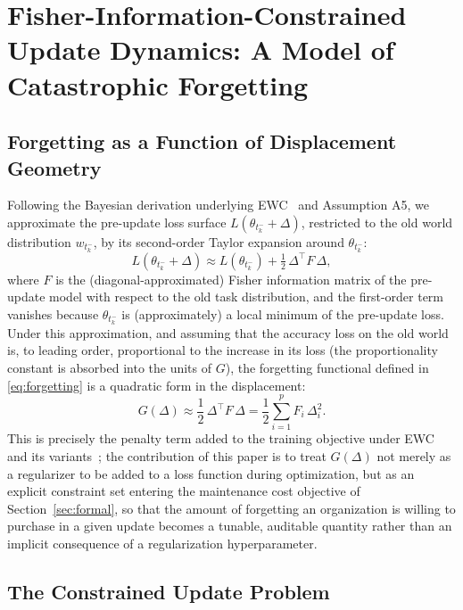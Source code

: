 \documentclass[electronics,article,submit,pdftex,moreauthors]{Definitions/mdpi}
\newcommand{\D}{\varDelta}                 %
\newcommand{\tkm}{t_k^{-}}
\begin{document}
\section{Fisher-Information-Constrained Update Dynamics: A Model of Catastrophic Forgetting}\label{sec:forgetting}

\subsection{Forgetting as a Function of Displacement Geometry}

Following the Bayesian derivation underlying EWC~\cite{Kirkpatrick2017} and Assumption A5, we approximate the pre-update loss surface $L(\theta_{\tkm}+\D)$, restricted to the old world distribution $w_{\tkm}$, by its second-order Taylor expansion around $\theta_{\tkm}$:
\begin{equation}\label{eq:taylor}
L\left(\theta_{\tkm}+\D\right)\approx L\left(\theta_{\tkm}\right)+\tfrac{1}{2}\,\D^{\top}F\,\D,
\end{equation}
where $F$ is the (diagonal-approximated) Fisher information matrix of the pre-update model with respect to the old task distribution, and the first-order term vanishes because $\theta_{\tkm}$ is (approximately) a local minimum of the pre-update loss. Under this approximation, and assuming that the accuracy loss on the old world is, to leading order, proportional to the increase in its loss (the proportionality constant is absorbed into the units of $G$), the forgetting functional defined in \eqref{eq:forgetting} is a quadratic form in the displacement:
\begin{equation}\label{eq:quadratic}
G(\D)\approx\frac{1}{2}\,\D^{\top}F\,\D=\frac{1}{2}\sum_{i=1}^{p}F_i\,\D_i^2.
\end{equation}
This is precisely the penalty term added to the training objective under EWC and its variants~\cite{Kirkpatrick2017}; the contribution of this paper is to treat $G(\D)$ not merely as a regularizer to be added to a loss function during optimization, but as an explicit constraint set entering the maintenance cost objective of Section~\ref{sec:formal}, so that the amount of forgetting an organization is willing to purchase in a given update becomes a tunable, auditable quantity rather than an implicit consequence of a regularization hyperparameter.

\subsection{The Constrained Update Problem}\label{sec:constrained}
\end{document}
